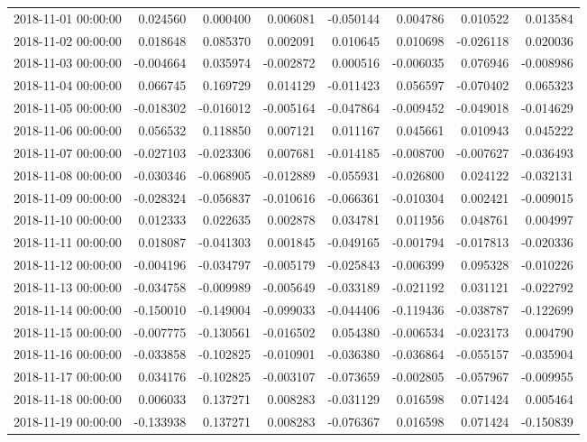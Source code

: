 \begin{tabular}{lrrrrrrr}
2018-11-01 00:00:00 & 0.024560 & 0.000400 & 0.006081 & -0.050144 & 0.004786 & 0.010522 & 0.013584 \\
2018-11-02 00:00:00 & 0.018648 & 0.085370 & 0.002091 & 0.010645 & 0.010698 & -0.026118 & 0.020036 \\
2018-11-03 00:00:00 & -0.004664 & 0.035974 & -0.002872 & 0.000516 & -0.006035 & 0.076946 & -0.008986 \\
2018-11-04 00:00:00 & 0.066745 & 0.169729 & 0.014129 & -0.011423 & 0.056597 & -0.070402 & 0.065323 \\
2018-11-05 00:00:00 & -0.018302 & -0.016012 & -0.005164 & -0.047864 & -0.009452 & -0.049018 & -0.014629 \\
2018-11-06 00:00:00 & 0.056532 & 0.118850 & 0.007121 & 0.011167 & 0.045661 & 0.010943 & 0.045222 \\
2018-11-07 00:00:00 & -0.027103 & -0.023306 & 0.007681 & -0.014185 & -0.008700 & -0.007627 & -0.036493 \\
2018-11-08 00:00:00 & -0.030346 & -0.068905 & -0.012889 & -0.055931 & -0.026800 & 0.024122 & -0.032131 \\
2018-11-09 00:00:00 & -0.028324 & -0.056837 & -0.010616 & -0.066361 & -0.010304 & 0.002421 & -0.009015 \\
2018-11-10 00:00:00 & 0.012333 & 0.022635 & 0.002878 & 0.034781 & 0.011956 & 0.048761 & 0.004997 \\
2018-11-11 00:00:00 & 0.018087 & -0.041303 & 0.001845 & -0.049165 & -0.001794 & -0.017813 & -0.020336 \\
2018-11-12 00:00:00 & -0.004196 & -0.034797 & -0.005179 & -0.025843 & -0.006399 & 0.095328 & -0.010226 \\
2018-11-13 00:00:00 & -0.034758 & -0.009989 & -0.005649 & -0.033189 & -0.021192 & 0.031121 & -0.022792 \\
2018-11-14 00:00:00 & -0.150010 & -0.149004 & -0.099033 & -0.044406 & -0.119436 & -0.038787 & -0.122699 \\
2018-11-15 00:00:00 & -0.007775 & -0.130561 & -0.016502 & 0.054380 & -0.006534 & -0.023173 & 0.004790 \\
2018-11-16 00:00:00 & -0.033858 & -0.102825 & -0.010901 & -0.036380 & -0.036864 & -0.055157 & -0.035904 \\
2018-11-17 00:00:00 & 0.034176 & -0.102825 & -0.003107 & -0.073659 & -0.002805 & -0.057967 & -0.009955 \\
2018-11-18 00:00:00 & 0.006033 & 0.137271 & 0.008283 & -0.031129 & 0.016598 & 0.071424 & 0.005464 \\
2018-11-19 00:00:00 & -0.133938 & 0.137271 & 0.008283 & -0.076367 & 0.016598 & 0.071424 & -0.150839 \\

\end{tabular}
